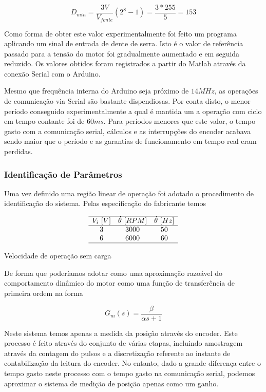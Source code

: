 \documentclass[a4paper,11pt]{article}
\begin{document}
$$
D_{min} = \frac{3V}{V_{fonte}}(2^8 -1) = \frac{3*255}{5} = 153
$$

Como forma de obter este valor experimentalmente foi feito um programa aplicando um sinal de entrada de dente de serra. Isto é o valor de referência passado para a tensão do motor foi gradualmente aumentado e em seguida reduzido. Os valores obtidos foram registrados a partir do Matlab através da conexão Serial com o Arduino.

Mesmo que frequência interna do Arduino seja próximo de $14 MHz$, as operações de comunicação via Serial são bastante dispendiosas. Por conta disto, o menor período conseguido experimentalmente a qual é mantida um a operação com ciclo em tempo contante foi de $60ms$. Para períodos menores que este valor, o tempo gasto com a comunicação serial, cálculos e as interrupções do encoder acabava sendo maior que o período e as garantias de funcionamento em tempo real eram perdidas.


\subsubsection{Identificação de Parâmetros}

Uma vez definido uma região linear de operação foi adotado o procedimento de identificação do sistema. Pelas especificação do fabricante temos

\begin{table}[H]
    $$
    \begin{array}{ccc}
         \hline
         V_i\ [V] & \dot{\theta}\ [RPM] & \dot{\theta}\ [Hz]\\
         \hline
         3 & 3000 & 50 \\
         6 & 6000 & 60 \\
         \hline
    \end{array}
    $$
    \caption{Velocidade de operação sem carga}
    \label{tab:dcmotor_speed}
\end{table}

De forma que poderíamos adotar como uma aproximação razoável do comportamento dinâmico do motor como uma função de transferência de primeira ordem na forma

\begin{equation}
    G_m(s) = \frac{\beta}{\alpha s + 1}
\end{equation}

Neste sistema temos apenas a medida da posição através do encoder. Este processo é feito através do conjunto de várias etapas, incluindo amostragem através da contagem do pulsos e a discretização referente ao instante de contabilização da leitura do encoder. No entanto, dado a grande diferença entre o tempo gasto neste processo com o tempo gasto na comunicação serial, podemos aproximar o sistema de medição de posição apenas como um ganho.
\end{document}
